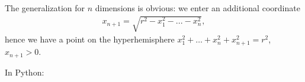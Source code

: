 \documentclass[letterpaper,10pt,english]{jupyterBook}
\begin{document}
\sphinxAtStartPar
The generalization for \( n \) dimensions is obvious: we enter an additional coordinate
\begin{equation*}
\begin{split} x_ {n + 1} = \sqrt {r ^ 2 - x_1 ^ 2 -...- x_n ^ 2},\end{split}
\end{equation*}
\sphinxAtStartPar
hence we have a point on the hyper\sphinxhyphen{}hemisphere \( x_1 ^ 2 + \dots + x_n ^ 2 + x_ {n + 1} ^ 2 = r ^ 2 \),  \(x_ {n + 1} >0\).

\sphinxAtStartPar
In Python:

\begin{sphinxVerbatim}[commandchars=\\\{\}]

 


\end{sphinxVerbatim}
\end{document}
